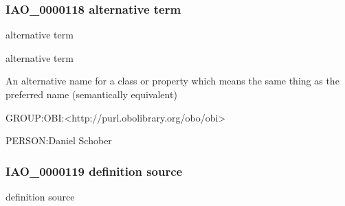 \documentclass[letterpaper,10pt,english]{sphinxmanual}
\begin{document}
\subsubsection{IAO\_0000118 \sphinxhyphen{} alternative term}
\label{\detokenize{doc-IAO_0000118:iao-0000118-alternative-term}}\label{\detokenize{doc-IAO_0000118:index-0}}\label{\detokenize{doc-IAO_0000118::doc}}
\begin{sphinxShadowBox}

\sphinxAtStartPar
alternative term
\end{sphinxShadowBox}

\begin{sphinxShadowBox}

\sphinxAtStartPar
alternative term
\end{sphinxShadowBox}

\begin{sphinxShadowBox}

\sphinxAtStartPar
An alternative name for a class or property which means the same thing as the preferred name (semantically equivalent)
\end{sphinxShadowBox}

\begin{sphinxShadowBox}

\sphinxAtStartPar
GROUP:OBI:\textless{}http://purl.obolibrary.org/obo/obi\textgreater{}
\end{sphinxShadowBox}

\begin{sphinxShadowBox}

\sphinxAtStartPar
PERSON:Daniel Schober
\end{sphinxShadowBox}
\begin{quote}

\ignorespaces \end{quote}


\subsubsection{IAO\_0000119 \sphinxhyphen{} definition source}
\label{\detokenize{doc-IAO_0000119:iao-0000119-definition-source}}\label{\detokenize{doc-IAO_0000119:index-0}}\label{\detokenize{doc-IAO_0000119::doc}}
\begin{sphinxShadowBox}

\sphinxAtStartPar
definition source
\end{sphinxShadowBox}
\end{document}

